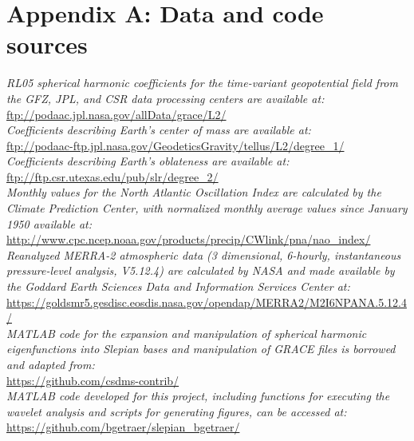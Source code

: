 \newpage 
\appendix

\section{Appendix A: Data and code sources \label{app:a}}
\textit{RL05 spherical harmonic coefficients for the time-variant geopotential field from the GFZ, JPL, and CSR data processing centers are available at:} \\
\indent \url{ftp://podaac.jpl.nasa.gov/allData/grace/L2/}\\

\noindent\textit{Coefficients describing Earth's center of mass \cite[spherical harmonic degree~1, from][]{swenson2008} are available at:} \\
\indent\url{ftp://podaac-ftp.jpl.nasa.gov/GeodeticsGravity/tellus/L2/degree_1/}\\

\noindent\textit{Coefficients describing Earth's oblateness \cite[spherical harmonic degree~2, order~0, from][]{cheng2013} are available at:} \\
\indent \url{ftp://ftp.csr.utexas.edu/pub/slr/degree_2/}\\

\noindent\textit{Monthly values for the North Atlantic Oscillation Index are calculated by the Climate Prediction Center, with normalized monthly average values since January 1950 available at:} \\
\indent \url{http://www.cpc.ncep.noaa.gov/products/precip/CWlink/pna/nao_index/}\\

\noindent\textit{Reanalyzed MERRA-2 atmospheric data (3 dimensional, 6-hourly, instantaneous pressure-level analysis, V5.12.4) are calculated by NASA and made available by the Goddard Earth Sciences Data and Information Services Center at:} \\
\indent \url{https://goldsmr5.gesdisc.eosdis.nasa.gov/opendap/MERRA2/M2I6NPANA.5.12.4/}\\



\noindent\textit{MATLAB code for the expansion and manipulation of spherical harmonic
eigenfunctions into Slepian bases and manipulation of GRACE files is borrowed and adapted from:} \\
\indent \url{https://github.com/csdms-contrib/}\\

\noindent\textit{MATLAB code developed for this project, including functions for executing the wavelet analysis and scripts for generating figures, can be accessed at:} \\
\indent \url{https://github.com/bgetraer/slepian_bgetraer/}\\




